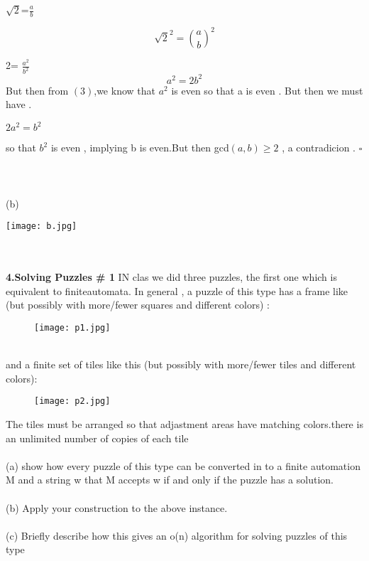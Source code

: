   \hspace{5cm}  $\sqrt{2}$=$\frac{a}{b}$ 
  
 \begin{equation}
     \sqrt{2}^2=\binom{a}{b}^2
 \end{equation}
 
\hspace{6.5cm} 2= $\frac{a^2}{b^2}$
 \begin{equation}
   a^2=2b^2
 \end{equation}
 But then from $(3)$,we know that $a^2$ is even so that a is even . But then we must have .
  \begin{center}
       $2a^2=b^2$
  \end{center}
so that $b^2$ is even , implying b is even.But then         gcd$(a,b)\ge 2 $ , a contradicion . \hspace{12.5cm}$\square $
 \\ \\ \\ \\
 (b)
 
    \texttt{[image: b.jpg]}

\\ \\ 
\Large \textbf{4.Solving Puzzles \# 1} IN clas  we did three puzzles, the first one which is equivalent to finiteautomata. In general , a puzzle of this type has a frame like (but possibly with more/fewer squares and different colors) :
\begin{figure}[h]
\centering
 \texttt{[image: p1.jpg]}
\end{figure} \\ 
 and a finite set of tiles like this (but possibly with more/fewer tiles and different colors):
 \begin{figure}[h]
     \centering
     \texttt{[image: p2.jpg]}
 \end{figure}
 The tiles must be arranged so that adjastment areas have matching colors.there is an unlimited number of copies of each tile \\ \\
 (a) show how every puzzle of this type can be converted in to a  finite automation M and a string w that M accepts w if and only if the puzzle has a solution. \\ \\
 (b) Apply your construction to the above instance.\\ \\
 (c) Briefly describe how this gives an o(n) algorithm for solving puzzles of this type


